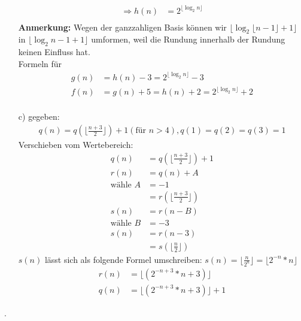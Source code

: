 \documentclass[ngerman,a4paper]{report}
\begin{document}
\begin{enumerate}
\begin{align*}
\Rightarrow h(n) &= 2^{\lfloor \log_2 n\rfloor}\\
\end{align*}
\textbf{Anmerkung: }Wegen der ganzzahligen Basis können wir $\lfloor \log_2 \lfloor n-1 \rfloor +1\rfloor$ in $\lfloor \log_2  n-1  +1\rfloor$ umformen, weil die Rundung innerhalb der Rundung keinen Einfluss hat.\\
Formeln für
\begin{align*}
g(n) &= h(n)-3 = 2^{\lfloor \log_2 n\rfloor}-3\\
f(n) &= g(n)+5 = h(n) + 2 = 2^{\lfloor \log_2 n\rfloor} + 2\\
\end{align*}
\item[c)] gegeben:
\begin{align*}
q(n) = q (\lfloor \frac{n+3}{2} \rfloor) +1 (\text{für } n > 4), q(1) = q(2) = q (3) = 1
\end{align*}
Verschieben vom Wertebereich:
\begin{align*}
q(n) &= q (\lfloor \frac{n+3}{2} \rfloor) +1\\
r(n) &= q(n)+A\\
\text{wähle } A &= -1\\
&= r(\lfloor \frac{n+3}{2} \rfloor)\\
s(n) &= r(n-B)\\
\text{wähle } B &= -3\\
s(n) &= r(n-3)\\
&= s(\lfloor \frac{n}{2} \rfloor)
\end{align*}
$s(n)$ lässt sich als folgende Formel umschreiben: $s(n) = \lfloor \frac{n}{2^n} \rfloor = \lfloor 2^{-n} * n \rfloor$
\begin{align*}
r(n) &= \lfloor (2^{-n+3} * n+3) \rfloor\\
q(n) &= \lfloor (2^{-n+3} * n+3) \rfloor+1
\end{align*}
\end{enumerate}







\newpage





.
\end{document}
